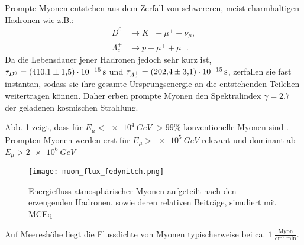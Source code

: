 Prompte Myonen entstehen aus dem Zerfall von schwereren, meist charmhaltigen Hadronen wie z.B.:
\begin{align*}
    D^{0} &\to K^{-} + \mu^{+} + \nu_{\mu}, \\
    \varLambda _{c}^{+} &\to p + \mu^{+} + \mu^{- }.
\end{align*}
Da die Lebensdauer jener Hadronen jedoch sehr kurz ist,
$\tau_{D^{0}}  = \SI[]{410.1 \pm 1.5 e-15}[]{s}$ und 
$\tau_{\varLambda _{c}^{+}}  = \SI[]{202.4 \pm 3.1 e-15}[]{s}$,
zerfallen sie fast instantan, sodass sie ihre gesamte Ursprungsenergie an die entstehenden Teilchen
weitertragen können. Daher erben prompte Myonen den
Spektralindex $\gamma = \num[]{2,7}$ der geladenen kosmischen Strahlung.

Abb. \ref{fig:prompt_muonflux} zeigt, dass für $E_\mu < \SI[]{e4}[]{GeV}$
$> 99\%$ konventionelle Myonen sind . 
Prompten Myonen werden erst für $E_\mu > \SI[]{e5}[]{GeV}$
relevant und dominant ab $E_\mu > \SI[]{2 e6}[]{GeV}$

\begin{figure}[h]
    \centering
    \texttt{[image: muon\_flux\_fedynitch.png]}
    \caption{Energiefluss atmosphärischer Myonen aufgeteilt nach den
     erzeugenden Hadronen, sowie deren relativen Beiträge,
      simuliert mit MCEq \cite{Fedynitch_2019}}
    \label{fig:prompt_muonflux}
\end{figure}






    
%
%   

Auf Meereshöhe liegt die Flussdichte von Myonen typischerweise bei ca. 
$1 \; \frac{\mathrm{Myon}}{\mathrm{cm}^2 \; \mathrm{min}}$.  \cite{PDG2020} \cite{Schouten2019}

